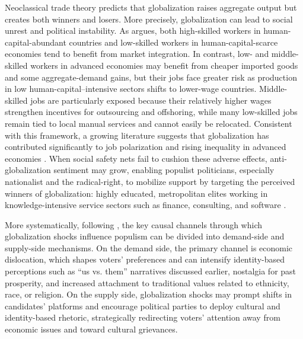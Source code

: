 \documentclass[
	11pt,				%
	oneside,			%
	a4paper,			%
	english,			%
	english				%
	]{abntex2ppgsi}
\theoremstyle{plain}
\theoremstyle{remark}
\theoremstyle{plain}%
\theoremstyle{remark}%
\begin{document}
Neoclassical trade theory predicts that globalization raises aggregate output but creates both winners and losers. More precisely, globalization can lead to social unrest and political instability. As  argues, both high-skilled workers in human-capital-abundant countries and low-skilled workers in human-capital-scarce economies tend to benefit from market integration. In contrast, low- and middle-skilled workers in advanced economies may benefit from cheaper imported goods and some aggregate-demand gains, but their jobs face greater risk as production in low human-capital–intensive sectors shifts to lower-wage countries. Middle-skilled jobs are particularly exposed because their relatively higher wages strengthen incentives for outsourcing and offshoring, while many low-skilled jobs remain tied to local manual services and cannot easily be relocated. Consistent with this framework, a growing literature suggests that globalization has contributed significantly to job polarization and rising inequality in advanced economies \cite{dehdari}. When social safety nets fail to cushion these adverse effects, anti-globalization sentiment may grow, enabling populist politicians, especially nationalist and the radical-right, to mobilize support by targeting the perceived winners of globalization: highly educated, metropolitan elites working in knowledge-intensive service sectors such as finance, consulting, and software \cite{colantone}.

More systematically, following , the key causal channels through which globalization shocks influence populism can be divided into demand-side and supply-side mechanisms. On the demand side, the primary channel is economic dislocation, which shapes voters’ preferences and can intensify identity-based perceptions such as “us vs. them” narratives discussed earlier, nostalgia for past prosperity, and increased attachment to traditional values related to ethnicity, race, or religion. On the supply side, globalization shocks may prompt shifts in candidates’ platforms and encourage political parties to deploy cultural and identity-based rhetoric, strategically redirecting voters’ attention away from economic issues and toward cultural grievances.
\end{document}
